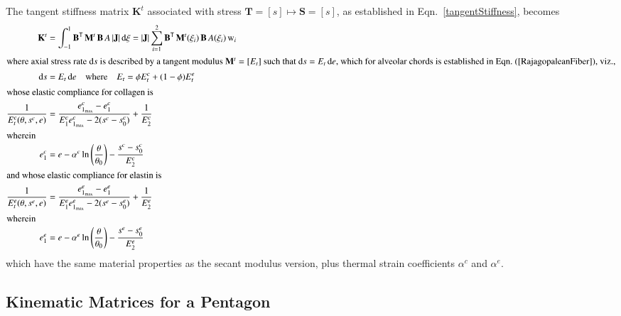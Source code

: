 The tangent stiffness matrix $\mathbf{K}^t$ associated with stress $\mathbf{T} = [s] \mapsto \mathbf{S} = [s]$, as established in Eqn.~\eqref{tangentStiffness}, becomes
\begin{subequations}
    \begin{align}
    \mathbf{K}^t & = \int_{-1}^{1} \mathbf{B}^{\mathsf{T}} \,  \mathbf{M}^t \, \mathbf{B} \, A \, |\mathbf{J}| \, \mathrm{d} \xi
    = |\mathbf{J}| \sum_{i=1}^{2}  \mathbf{B}^{\mathsf{T}} \, \mathbf{M}^t (\xi_i) \, \mathbf{B} \, A (\xi_i) \, \mathrm{w}_i \\
    \intertext{where axial stress rate $\mathrm{d} s$ is described by a tangent modulus $\mathbf{M}^{t} = [ E_t ]$ such that $\mathrm{d} s = E_t \, \mathrm{d} e$, which for alveolar chords is established in Eqn.~(\ref{RajagopaleanFiber}), viz.,}
    \mathrm{d} s & = E_t \, \mathrm{d} e 
    \quad \text{where} \quad
    E_t = \phi E^c_t + (1-\phi) E^e_t  \\
    \intertext{whose elastic compliance for collagen is}
    \frac{1}{E^c_t (\theta , s^c , e)} & = \frac{e^c_{1_{\max}} - e_1^c}
    {E^c_1 e^c_{1_{\max}} - 2 (s^c - s^c_0)} + \frac{1}{E^c_2} \\
    \intertext{wherein} 
    e^c_1 & = e - \alpha^c \ln \left( \frac{\theta}{\theta_0} \right) - 
    \frac{s^c - s^c_0}{E^c_2} \\
    \intertext{and whose elastic compliance for elastin is}
    \frac{1}{E^e_t (\theta , s^e , e)} & = \frac{e^e_{1_{\max}} - e_1^e}
    {E^e_1 e^e_{1_{\max}} - 2 (s^e - s^e_0)} + \frac{1}{E^e_2} \\
    \intertext{wherein} 
    e^e_1 & = e - \alpha^e \ln \left( \frac{\theta}{\theta_0} \right) - 
    \frac{s^e - s^e_0}{E^e_2}
    \end{align}
\end{subequations} 
which have the same material properties as the secant modulus version, plus thermal strain coefficients $\alpha^c$ and $\alpha^e$.

\subsection{Kinematic Matrices for a Pentagon}

